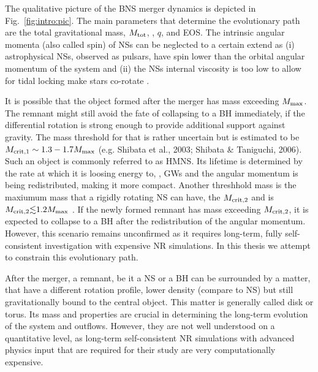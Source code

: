 The qualitative picture of the \ac{BNS} merger dynamics is depicted in Fig.~\ref{fig:intro:pic}. 
The main parameters that determine the evolutionary path are the total gravitational mass, 
$M_{\rm tot}$, \mr, $q$, and \ac{EOS}. The intrinsic angular momenta (also called spin) of \acp{NS} 
can be neglected to a certain extend as (i) astrophysical \acp{NS}, observed as pulsars, have 
spin lower than the orbital angular momentum of the system and (ii) the \acp{NS} internal 
viscosity is too low to allow for tidal locking make stars co-rotate \cite{(e.g. Bildsten & Cutler, 1992)}.

It is possible that the object formed after the merger has mass exceeding $M_{\rm max}$. 
The remnant might still avoid the fate of collapsing to a \ac{BH} immediately, if the differential 
rotation is strong enough to provide additional support against gravity. The mass threshold 
for that is rather uncertain but is estimated to be $M_{\rm crit,1}\sim1.3-1.7M_{\rm max}$ 
(e.g. Shibata et al., 2003; Shibata & Taniguchi, 2006). Such an object is commonly referred to as 
\ac{HMNS}. Its lifetime is determined by the rate at which it is loosing energy to, \eg, \acp{GW}
and the angular momentum is being redistributed, making it more compact. 
Another threshhold mass is the maxiumum mass that a rigidly rotating \ac{NS} can have, the 
$M_{\rm crit,2}$ and is $M_{\rm crit,2}{\lesssim}1.2M_{\rm max}$ \cite{Cook et al., 1994}. 
If the newly formed remnant has mass exceeding $M_{\rm crit,2}$, it is expected to collapse to 
a \ac{BH} after the redistribution of the angular momentum. However, this scenario remains 
unconfirmed as it requires long-term, fully self-consistent investigation with expensive 
\ac{NR} simulations. In this thesis we attempt to constrain this evolutionary path.

After the merger, a remnant, be it a \ac{NS} or a \ac{BH} can be surrounded by a matter, that 
have a different rotation profile, lower density (compare to \ac{NS}) but still gravitationally 
bound to the central object. This matter is generally called disk or torus. Its mass and 
properties are crucial in determining the long-term evolution of the system and \pmerg{} 
outflows. However, they are not well understood on a quantitative level, as long-term 
self-consistent \ac{NR} simulations with advanced physics input that are required for their study 
are very computationally expensive. 

